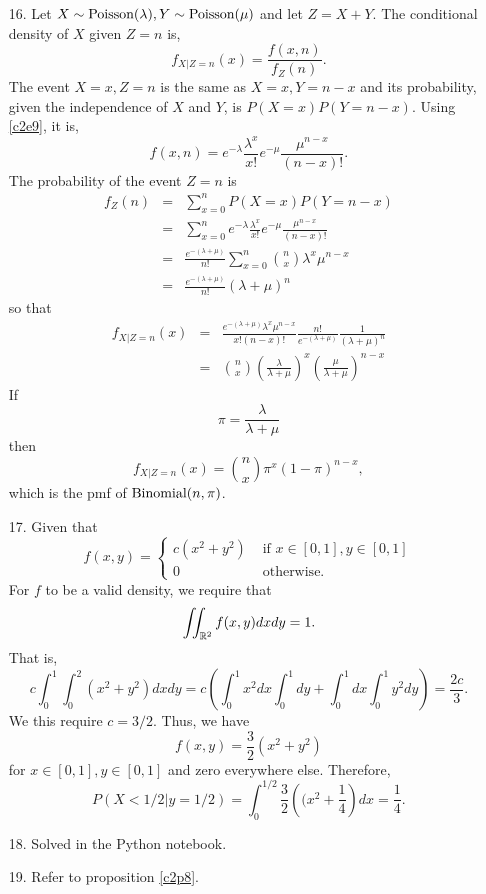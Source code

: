 \documentclass{article}
\begin{document}
\begin{enumerate}
\item[16.] Let $X \sim \text{Poisson}(\lambda), Y \sim \text{Poisson}(\mu)$ and let $Z = X + Y$. 
The conditional density of $X$ given $Z = n$ is,
\[
f_{X|Z=n}(x) = \frac{f(x, n)}{f_Z(n)}.
\]
The event $X = x, Z = n$ is the same as $X = x, Y = n - x$ and its probability,
given the independence of $X$ and $Y$, is $P(X=x)P(Y=n-x)$. Using \eqref{c2e9},
it is,
\[
f(x, n) = e^{-\lambda}\frac{\lambda^x}{x!} e^{-\mu}\frac{\mu^{n-x}}{(n-x)!}.
\]
The probability of the event $Z = n$ is
\begin{eqnarray*}
f_Z(n) &=& \sum_{x=0}^nP(X=x)P(Y=n-x) \\
 &=& \sum_{x=0}^n e^{-\lambda}\frac{\lambda^x}{x!} e^{-\mu}\frac{\mu^{n-x}}{(n-x)!} \\
 &=& \frac{e^{-(\lambda+\mu)}}{n!}\sum_{x=0}^n\binom{n}{x}\lambda^x\mu^{n-x} \\
 &=& \frac{e^{-(\lambda+\mu)}}{n!}(\lambda + \mu)^n
\end{eqnarray*}
so that
\begin{eqnarray*}
f_{X|Z=n}(x) &=& \frac{e^{-(\lambda+\mu)}\lambda^x\mu^{n-x}}{x!(n-x)!}
     \frac{n!}{e^{-(\lambda+\mu)}}\frac{1}{(\lambda + \mu)^n} \\
 &=& \binom{n}{x}\left(\frac{\lambda}{\lambda+\mu}\right)^x
     \left(\frac{\mu}{\lambda+\mu}\right)^{n-x}
\end{eqnarray*}
If 
\[
\pi = \frac{\lambda}{\lambda+\mu}
\]
then 
\[
f_{X|Z=n}(x) = \binom{n}{x}\pi^x(1 - \pi)^{n-x},
\]
which is the pmf of $\text{Binomial}(n, \pi)$.

\item[17.] Given that
\[
f(x, y) = \begin{cases}
c(x^2 + y^2) & \text{ if } x \in [0, 1], y \in [0, 1] \\
0 & \text{ otherwise.}
\end{cases}
\]
For $f$ to be a valid density, we require that
\[
\iint_{\mathbb{R}^2}f(x, y)dxdy = 1.
\]
That is,
\[
c\int_0^1\int_0^2 (x^2 + y^2)dxdy = c\left(\int_0^1x^2dx\int_0^1 dy + 
\int_0^1dx\int_0^1 y^2dy\right) = \frac{2c}{3}.
\]
We this require $c = 3/2$. Thus, we have 
\[
f(x, y) = \frac{3}{2}(x^2 + y^2)
\]
for $x \in [0, 1], y \in [0, 1]$ and zero everywhere else. Therefore,
\[
P(X < 1/2|y = 1/2) = \int_0^{1/2}\frac{3}{2}\left((x^2 + \frac{1}{4}\right)dx = 
\frac{1}{4}.
\]

\item[18.] Solved in the Python notebook.

\item[19.] Refer to proposition \ref{c2p8}.


\end{enumerate}
\end{document}
